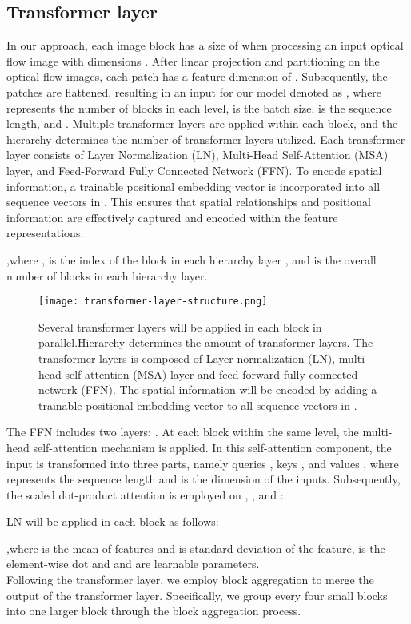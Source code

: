 \documentclass[review,12pt, 3p]{elsarticle}
\begin{document}
\subsection{Transformer layer}
In our approach, each image block has a size of  when processing an input optical flow image with dimensions . After linear projection and partitioning on the optical flow images, each patch has a feature dimension of . Subsequently, the patches are flattened, resulting in an input for our model denoted as , where  represents the number of blocks in each level,  is the batch size,  is the sequence length, and . Multiple transformer layers are applied within each block, and the hierarchy determines the number of transformer layers utilized. Each transformer layer consists of Layer Normalization (LN), Multi-Head Self-Attention (MSA) layer, and Feed-Forward Fully Connected Network (FFN). To encode spatial information, a trainable positional embedding vector is incorporated into all sequence vectors in . This ensures that spatial relationships and positional information are effectively captured and encoded within the feature representations:

,where ,  is the index of the  block in each hierarchy layer , and  is the overall number of blocks in each hierarchy layer. \\
\begin{figure*}[t]
\centering
  \texttt{[image: transformer-layer-structure.png]}
  \caption{Several transformer layers will be applied in each block in parallel.Hierarchy determines the amount of transformer layers. The transformer layers is composed of Layer normalization (LN), multi-head self-attention (MSA) layer and feed-forward fully connected network (FFN). The spatial information will be encoded by adding a trainable positional embedding vector to all sequence vectors in .}
  \label{transformer-layer-structure}
\end{figure*}
The FFN includes two layers: . At each block  within the same level, the multi-head self-attention mechanism is applied. In this self-attention component, the input  is transformed into three parts, namely queries , keys , and values , where  represents the sequence length and  is the dimension of the inputs. Subsequently, the scaled dot-product attention is employed on , , and :

LN will be applied in each block as follows:

,where  is the mean of features and  is standard deviation of the feature,  is the element-wise dot and  and  are learnable parameters. \\
Following the transformer layer, we employ block aggregation to merge the output of the transformer layer. Specifically, we group every four small blocks into one larger block through the block aggregation process. 
\end{document}
